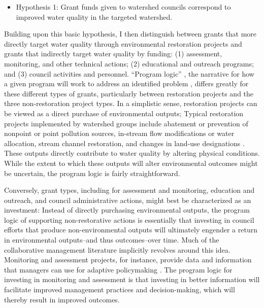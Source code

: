\documentclass[11pt,a4paper,titlepage]{article}
\begin{document}
\begin{itemize}
\item Hypothesis 1: Grant funds given to watershed councils correspond to improved water quality in the targeted watershed.
\end{itemize}

Building upon this basic hypothesis, I then distinguish between grants that more directly target water quality through environmental restoration projects and grants that indirectly target water quality by funding: (1) assessment, monitoring, and other technical actions; (2) educational and outreach programs; and (3) council activities and personnel. “Program logic” \parencite{bickman1987}, the narrative for how a given program will work to address an identified problem \parencite{margerum2011,mclaughlin1999}, differs greatly for these different types of grants, particularly between restoration projects and the three non-restoration project types. In a simplistic sense, restoration projects can be viewed as a direct purchase of environmental outputs; Typical restoration projects implemented by watershed groups include abatement or prevention of nonpoint or point pollution sources, in-stream flow modifications or water allocation, stream channel restoration, and changes in land-use designations \parencite{leach2002}. These outputs directly contribute to water quality by altering physical conditions. While the extent to which these outputs will alter environmental outcomes might be uncertain, the program logic is fairly straightforward.

Conversely, grant types, including for assessment and monitoring, education and outreach, and council administrative actions, might best be characterized as an investment: Instead of directly purchasing environmental outputs, the program logic of supporting non-restorative actions is essentially that investing in council efforts that produce non-environmental outputs will ultimately engender a return in environmental outputs--and thus outcomes--over time. Much of the collaborative management literature implicitly revolves around this idea. Monitoring and assessment projects, for instance, provide data and information that managers can use for adaptive policymaking \parencite{huntington2000, leach2002,yaffee1996}. The program logic for investing in monitoring and assessment is that investing in better information will facilitate improved management practices and decision-making, which will thereby result in improved outcomes. 
\end{document}
